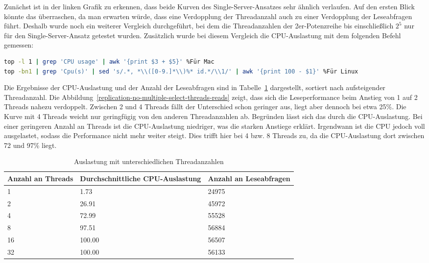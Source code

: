 Zunächst ist in der linken Grafik zu erkennen, dass beide Kurven des Single-Server-Ansatzes sehr ähnlich verlaufen.
Auf den ersten Blick könnte das überraschen, da man erwarten würde, dass eine Verdopplung der Threadanzahl auch zu einer Verdopplung der Leseabfragen führt.
Deshalb wurde noch ein weiterer Vergleich durchgeführt, bei dem die Threadanzahlen der 2er-Potenzreihe bis einschließlich $2^5$ nur für den Single-Server-Ansatz getestet wurden.
Zusätzlich wurde bei diesem Vergleich die CPU-Auslastung mit dem folgenden Befehl gemessen:

\vspace{-5pt}
\begin{lstlisting}[language=bash,caption=Messen der CPU-Auslastung,label={lst:replication-cpu-usage},style=custom_daniel,basicstyle=\ttfamily\scriptsize]
top -l 1 | grep 'CPU usage' | awk '{print $3 + $5}' %Für Mac
top -bn1 | grep 'Cpu(s)' | sed 's/.*, *\\([0-9.]*\\)%* id.*/\\1/' | awk '{print 100 - $1}' %Für Linux
\end{lstlisting}
\vspace{-5pt}

Die Ergebnisse der CPU-Auslastung und der Anzahl der Leseabfragen sind in Tabelle~\ref{tab:replication-multiple-select-threads} dargestellt, sortiert nach aufsteigender Threadanzahl.
Die Abbildung~\ref{replication-no-multiple-select-threads-reads} zeigt, dass sich die Leseperformance beim Anstieg von 1 auf 2 Threads nahezu verdoppelt.
Zwischen 2 und 4 Threads fällt der Unterschied schon geringer aus, liegt aber dennoch bei etwa 25\%.
Die Kurve mit 4 Threads weicht nur geringfügig von den anderen Threadanzahlen ab.
Begründen lässt sich das durch die CPU-Auslastung.
Bei einer geringeren Anzahl an Threads ist die CPU-Auslastung niedriger, was die starken Anstiege erklärt.
Irgendwann ist die CPU jedoch voll ausgelastet, sodass die Performance nicht mehr weiter steigt.
Dies trifft hier bei 4 bzw. 8 Threads zu, da die CPU-Auslastung dort zwischen 72 und 97\% liegt.

\vspace{-2pt}
\begin{table}[H]
  \centering
  \scriptsize
  \begin{tabular}{|l|l|l|}
    \hline
    \textbf{Anzahl an Threads} & \textbf{Durchschnittliche CPU-Auslastung} & \textbf{Anzahl an Leseabfragen} \\
    \hline
    1 & 1.73 & 24975 \\
    2 & 26.91 & 45972 \\
    4 & 72.99 & 55528 \\
    8 & 97.51 & 56884 \\
    16 & 100.00 & 56507 \\
    32 & 100.00 & 56133 \\
    \hline
  \end{tabular}
  \vspace{3pt}
  \caption{Auslastung mit unterschiedlichen Threadanzahlen}
  \label{tab:replication-multiple-select-threads}
\end{table}
\vspace{-25pt}

